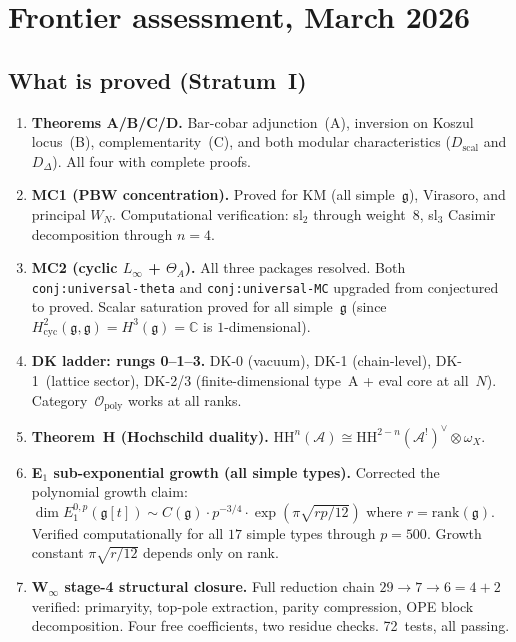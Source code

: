 \documentclass[11pt]{article}
\newcommand{\cA}{\mathcal{A}}
\newcommand{\cO}{\mathcal{O}}
\newcommand{\fg}{\mathfrak{g}}
\begin{document}
\section{Frontier assessment, March 2026}
\label{sec:frontier-march-2026}

\subsection{What is proved (Stratum~I)}

\begin{enumerate}[label=(\roman*)]
\item \textbf{Theorems A/B/C/D.}
  Bar-cobar adjunction~(A), inversion on Koszul locus~(B),
  complementarity~(C), and both modular characteristics
  ($D_{\mathrm{scal}}$ and $D_\Delta$).  All four with complete proofs.

\item \textbf{MC1 (PBW concentration).}
  Proved for KM (all simple~$\fg$), Virasoro, and principal $W_N$.
  Computational verification: sl$_2$ through weight~8, sl$_3$
  Casimir decomposition through $n=4$.

\item \textbf{MC2 (cyclic $L_\infty$ + $\Theta_A$).}
  All three packages resolved.  Both \texttt{conj:universal-theta}
  and \texttt{conj:universal-MC} upgraded from conjectured to proved.
  Scalar saturation proved for all simple~$\fg$ (since $H^2_{\mathrm{cyc}}(\fg,\fg)
  = H^3(\fg) = \mathbb{C}$ is $1$-dimensional).

\item \textbf{DK ladder: rungs 0--1\textonehalf--3.}
  DK-0 (vacuum), DK-1 (chain-level), DK-1\textonehalf\ (lattice sector),
  DK-2/3 (finite-dimensional type~A + eval core at all~$N$).
  Category~$\cO_{\mathrm{poly}}$ works at all ranks.

\item \textbf{Theorem~H (Hochschild duality).}
  $\mathrm{HH}^n(\cA) \cong \mathrm{HH}^{2-n}(\cA^!)^\vee\otimes\omega_X$.

\item \textbf{E$_1$ sub-exponential growth (all simple types).}
  Corrected the polynomial growth claim: $\dim E_1^{0,p}(\fg[t]) \sim
  C(\fg)\cdot p^{-3/4}\cdot\exp(\pi\sqrt{rp/12})$ where $r = \mathrm{rank}(\fg)$.
  Verified computationally for all $17$ simple types through $p = 500$.
  Growth constant $\pi\sqrt{r/12}$ depends only on rank.

\item \textbf{W$_\infty$ stage-4 structural closure.}
  Full reduction chain $29 \to 7 \to 6 = 4 + 2$ verified:
  primaryity, top-pole extraction, parity compression, OPE block
  decomposition.  Four free coefficients, two residue checks.
  72~tests, all passing.


\end{enumerate}
\end{document}
